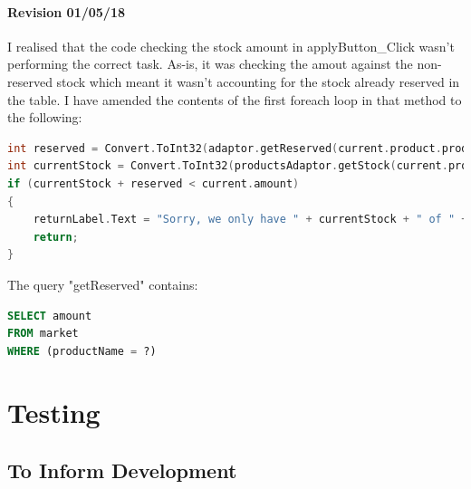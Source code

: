 ﻿\documentclass{article}
\begin{document}
    \paragraph{Revision 01/05/18}
    I realised that the code checking the stock amount in applyButton\_Click wasn't performing the correct task.
    As-is, it was checking the amout against the non-reserved stock which meant it wasn't accounting for the stock already reserved in the table.
    I have amended the contents of the first foreach loop in that method to the following:
    \begin{lstlisting}[language=C]
int reserved = Convert.ToInt32(adaptor.getReserved(current.product.productName));
int currentStock = Convert.ToInt32(productsAdaptor.getStock(current.product.productName));
if (currentStock + reserved < current.amount)
{
    returnLabel.Text = "Sorry, we only have " + currentStock + " of " + current.product.productName;
    return;
}
    \end{lstlisting}
    The query "getReserved" contains:
    \begin{lstlisting}[language=SQL]
SELECT amount
FROM market
WHERE (productName = ?)
    \end{lstlisting}
    \section{Testing}
    \subsection{To Inform Development}
\end{document}
